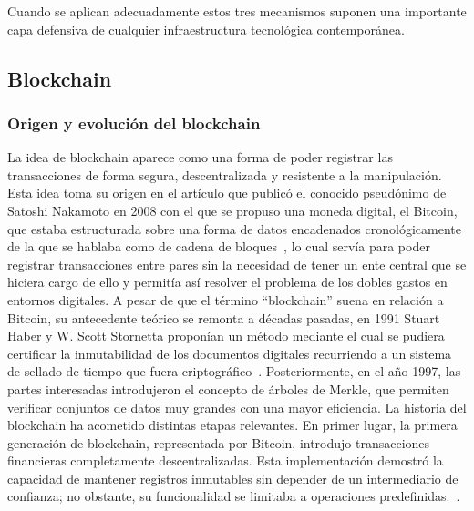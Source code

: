 Cuando se aplican adecuadamente estos tres mecanismos suponen una importante capa defensiva de cualquier infraestructura tecnológica contemporánea.


\subsection{Blockchain}
\subsubsection{ Origen y evolución del blockchain}
La idea de blockchain aparece como una forma de poder registrar las transacciones de forma segura, descentralizada y resistente a la manipulación. Esta idea toma su origen en el artículo que publicó el conocido pseudónimo de Satoshi Nakamoto en 2008 con el que se propuso una moneda digital, el Bitcoin, que estaba estructurada sobre una forma de datos encadenados cronológicamente de la que se hablaba como de cadena de bloques~\cite{nakamoto2008bitcoin}, lo cual servía para poder registrar transacciones entre pares sin la necesidad de tener un ente central que se hiciera cargo de ello y permitía así resolver el problema de los dobles gastos en entornos digitales.
A pesar de que el término “blockchain” suena en relación a Bitcoin, su antecedente teórico se remonta a décadas pasadas, en 1991 Stuart Haber y W. Scott Stornetta proponían un método mediante el cual se pudiera certificar la inmutabilidad de los documentos digitales recurriendo a un sistema de sellado de tiempo que fuera criptográfico~\cite{Haber1991}. Posteriormente, en el año 1997, las partes interesadas introdujeron el concepto de árboles de Merkle, que permiten verificar conjuntos de datos muy grandes con una mayor eficiencia.
La historia del blockchain ha acometido distintas etapas relevantes. En primer lugar, la primera generación de blockchain, representada por Bitcoin, introdujo transacciones financieras completamente descentralizadas. Esta implementación demostró la capacidad de mantener registros inmutables sin depender de un intermediario de confianza; no obstante, su funcionalidad se limitaba a operaciones predefinidas.~\cite{nakamoto2008bitcoin}.

